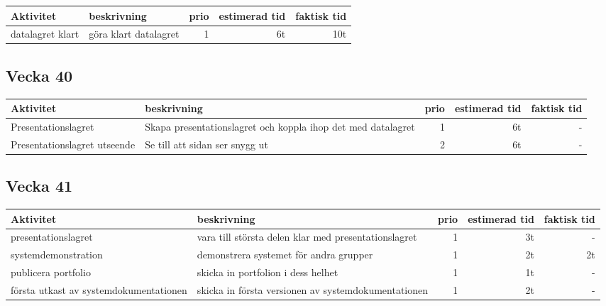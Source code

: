 \documentclass{TDP003mall}
\begin{document}
\begin{table}[!h]
  \begin{tabularx}{\linewidth}{|l|X|r|r|r|}
\hline

Aktivitet & beskrivning & prio & estimerad tid & faktisk tid \\\hline
datalagret klart & göra klart datalagret & 1 & 6t & 10t \\\hline

\end{tabularx}
\end{table}

\subsection{Vecka 40 	}

\begin{table}[!h]
  \begin{tabularx}{\linewidth}{|l|X|r|r|r|}
\hline

Aktivitet & beskrivning & prio & estimerad tid & faktisk tid \\\hline
Presentationslagret & Skapa presentationslagret och koppla ihop det med datalagret & 1 & 6t & -\\\hline
Presentationslagret utseende & Se till att sidan ser snygg ut & 2 & 6t & -\\\hline

\end{tabularx}
\end{table}

\subsection{Vecka 41}

\begin{table}[!h]
  \begin{tabularx}{\linewidth}{|l|X|r|r|r|}
\hline

Aktivitet & beskrivning & prio & estimerad tid & faktisk tid \\\hline
presentationslagret & vara till största delen klar med presentationslagret & 1 & 3t & -\\\hline
systemdemonstration & demonstrera systemet för andra grupper & 1 & 2t & 2t\\\hline
publicera portfolio & skicka in portfolion i dess helhet & 1 & 1t & -\\\hline
första utkast av systemdokumentationen & skicka in första versionen av systemdokumentationen & 1 & 2t & -\\\hline

\end{tabularx}
\end{table}
\end{document}
